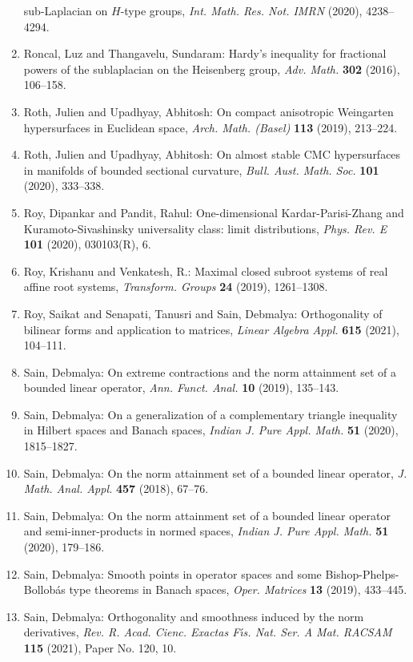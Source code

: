\begin{enumerate}
sub-{L}aplacian on {$H$}-type groups, \emph{Int. Math. Res. Not. IMRN} {\bf } (2020), 4238--4294.
\item Roncal, Luz and Thangavelu, Sundaram: Hardy's inequality for fractional powers of the sublaplacian
on the {H}eisenberg group, \emph{Adv. Math.} {\bf 302} (2016), 106--158.
\item Roth, Julien and Upadhyay, Abhitosh: On compact anisotropic {W}eingarten hypersurfaces in
{E}uclidean space, \emph{Arch. Math. (Basel)} {\bf 113} (2019), 213--224.
\item Roth, Julien and Upadhyay, Abhitosh: On almost stable {CMC} hypersurfaces in manifolds of bounded
sectional curvature, \emph{Bull. Aust. Math. Soc.} {\bf 101} (2020), 333--338.
\item Roy, Dipankar and Pandit, Rahul: One-dimensional {K}ardar-{P}arisi-{Z}hang and
{K}uramoto-{S}ivashinsky universality class: limit
distributions, \emph{Phys. Rev. E} {\bf 101} (2020), 030103(R), 6.
\item Roy, Krishanu and Venkatesh, R.: Maximal closed subroot systems of real affine root systems, \emph{Transform. Groups} {\bf 24} (2019), 1261--1308.
\item Roy, Saikat and Senapati, Tanusri and Sain, Debmalya: Orthogonality of bilinear forms and application to matrices, \emph{Linear Algebra Appl.} {\bf 615} (2021), 104--111.
\item Sain, Debmalya: On extreme contractions and the norm attainment set of a
bounded linear operator, \emph{Ann. Funct. Anal.} {\bf 10} (2019), 135--143.
\item Sain, Debmalya: On a generalization of a complementary triangle inequality in
{H}ilbert spaces and {B}anach spaces, \emph{Indian J. Pure Appl. Math.} {\bf 51} (2020), 1815--1827.
\item Sain, Debmalya: On the norm attainment set of a bounded linear operator, \emph{J. Math. Anal. Appl.} {\bf 457} (2018), 67--76.
\item Sain, Debmalya: On the norm attainment set of a bounded linear operator and
semi-inner-products in normed spaces, \emph{Indian J. Pure Appl. Math.} {\bf 51} (2020), 179--186.
\item Sain, Debmalya: Smooth points in operator spaces and some
{B}ishop-{P}helps-{B}ollob\'{a}s type theorems in {B}anach spaces, \emph{Oper. Matrices} {\bf 13} (2019), 433--445.
\item Sain, Debmalya: Orthogonality and smoothness induced by the norm derivatives, \emph{Rev. R. Acad. Cienc. Exactas F\'{\i}s. Nat. Ser. A Mat. RACSAM} {\bf 115} (2021), Paper No. 120, 10.

\end{enumerate}
